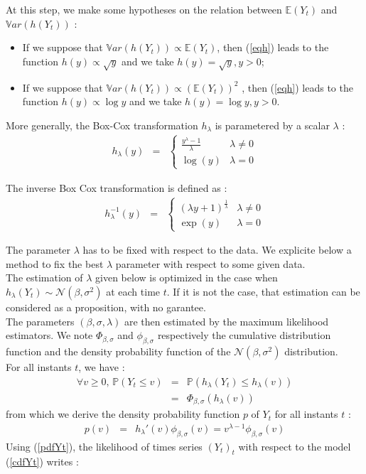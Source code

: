 At this step, we make some hypotheses on the relation between $\mathbb{E}(Y_t)$ and $\mathbb{V}ar(h(Y_t))$ : 
\begin{itemize}
  \item If we suppose that  $\mathbb{V}ar(h(Y_t)) \propto \mathbb{E}(Y_t)$,  then (\ref{eqh}) leads to the function $h(y) \propto \sqrt{y}$ and we take $h(y) = \sqrt{y}, y>0$;
  \item If we suppose that $\mathbb{V}ar(h(Y_t)) \propto (\mathbb{E}(Y_t))^2$ , then  (\ref{eqh}) leads to the function $h(y) \propto \log{y}$ and we take $h(y) = \log{y}, y>0$.
\end{itemize}

More generally, the Box-Cox transformation $h_\lambda$ is parametered by a scalar $\lambda$ :
\begin{eqnarray}
 \label{BoxCoxModel}
 h_\lambda(y) & = &
\left\{
\begin{array}{ll}
\frac{y^\lambda-1}{\lambda} & \lambda \neq 0 \\
\log(y) 			   & \lambda = 0
\end{array}
\right.
\end{eqnarray}

The inverse Box Cox transformation is defined as :
\begin{eqnarray}
 \label{InverseBoxCoxModel}
 h^{-1}_\lambda(y) & = &
\left\{
\begin{array}{ll}
\displaystyle (\lambda y + 1)^{\frac{1}{\lambda}} & \lambda \neq 0 \\
\displaystyle \exp(y) 			   & \lambda = 0
\end{array}
\right.
\end{eqnarray}

The parameter $\lambda$ has to be fixed with respect to the data. We explicite below a method to fix the best $\lambda$ parameter with respect to some given data. \\
The estimation of $\lambda$ given below is optimized in the case when $h_\lambda(Y_t) \sim \mathcal{N}(\beta , \sigma^2 )$ at each time $t$. If it is not the case, that estimation can be considered as a proposition, with no garantee.\\
The parameters $(\beta,\sigma,\lambda)$ are then estimated by the maximum likelihood estimators. We note $\Phi_{\beta, \sigma}$ and $\phi_{\beta, \sigma}$ respectively the cumulative distribution function and the density probability function of the $\mathcal{N}(\beta , \sigma^2)$ distribution.\\
For all instants $t$, we have : 
\begin{eqnarray}\label{cdfYt}
  \forall v \geq 0, \, \mathbb{P}( Y_t \leq v ) & = & \mathbb{P}( h_\lambda(Y_t) \leq h_\lambda(v) ) \\
		& = & \Phi_{\beta, \sigma} \left(h_\lambda(v)\right)
\end{eqnarray}
from which we derive the  density probability function $p$ of $Y_t$ for all instants $t$ :
\begin{eqnarray}\label{pdfYt}
 p(v) & = & h_\lambda'(v)\phi_{\beta, \sigma}(v) = v^{\lambda - 1}\phi_{\beta, \sigma}(v)
\end{eqnarray}
Using (\ref{pdfYt}), the likelihood of times series $(Y_t)_t$ with respect to the model (\ref{cdfYt})  writes :

